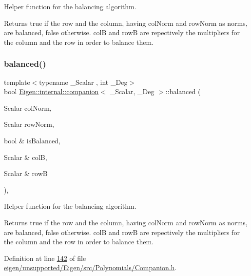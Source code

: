 Helper function for the balancing algorithm. \begin{DoxyReturn}{Returns}
true if the row and the column, having col\+Norm and row\+Norm as norms, are balanced, false otherwise. colB and rowB are repectively the multipliers for the column and the row in order to balance them. 
\end{DoxyReturn}
\mbox{\label{class_eigen_1_1internal_1_1companion_ac5c7b024fdd218ea68165bd948f48e83}} 
\subsubsection{\texorpdfstring{balanced()}{balanced()}\hspace{0.1cm}{\footnotesize\ttfamily [2/2]}}
{\footnotesize\ttfamily template$<$typename \+\_\+\+Scalar , int \+\_\+\+Deg$>$ \\
bool \hyperlink{class_eigen_1_1internal_1_1companion}{Eigen\+::internal\+::companion}$<$ \+\_\+\+Scalar, \+\_\+\+Deg $>$\+::balanced (\begin{DoxyParamCaption}\item[{Scalar}]{col\+Norm,  }\item[{Scalar}]{row\+Norm,  }\item[{bool \&}]{is\+Balanced,  }\item[{Scalar \&}]{colB,  }\item[{Scalar \&}]{rowB }\end{DoxyParamCaption})\hspace{0.3cm}{\ttfamily [inline]}, {\ttfamily [protected]}}

Helper function for the balancing algorithm. \begin{DoxyReturn}{Returns}
true if the row and the column, having col\+Norm and row\+Norm as norms, are balanced, false otherwise. colB and rowB are repectively the multipliers for the column and the row in order to balance them. 
\end{DoxyReturn}


Definition at line \hyperlink{eigen_2unsupported_2_eigen_2src_2_polynomials_2_companion_8h_source_l00142}{142} of file \hyperlink{eigen_2unsupported_2_eigen_2src_2_polynomials_2_companion_8h_source}{eigen/unsupported/\+Eigen/src/\+Polynomials/\+Companion.\+h}.

